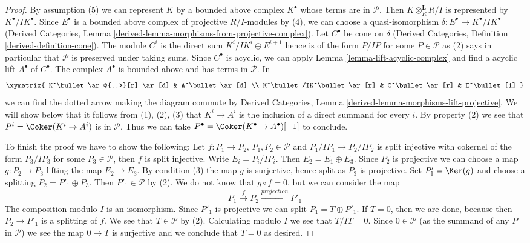 \begin{proof}
By assumption (5) we can represent $K$ by a bounded above complex 
$K^\bullet$ whose terms are in $\mathcal{P}$. Then $K \otimes_R^\mathbf{L} R/I$
is represented by $K^\bullet/IK^\bullet$. Since $E^\bullet$ is
a bounded above complex of projective $R/I$-modules by (4), 
we can choose a quasi-isomorphism $\delta : E^\bullet \to K^\bullet/IK^\bullet$
(Derived Categories, Lemma
\ref{derived-lemma-morphisms-from-projective-complex}).
Let $C^\bullet$ be cone on $\delta$
(Derived Categories, Definition \ref{derived-definition-cone}).
The module $C^i$ is the direct sum $K^i/IK^i \oplus E^{i + 1}$
hence is of the form $P/IP$ for some $P \in \mathcal{P}$
as (2) says in particular that $\mathcal{P}$ is preserved under taking sums.
Since $C^\bullet$ is acyclic, we can apply
Lemma \ref{lemma-lift-acyclic-complex} and find a acyclic
lift $A^\bullet$ of $C^\bullet$. The complex $A^\bullet$ is
bounded above and has terms in $\mathcal{P}$. In
$$
\xymatrix{
K^\bullet \ar@{..>}[r] \ar[d] & A^\bullet \ar[d] \\
K^\bullet/IK^\bullet \ar[r] & C^\bullet \ar[r] & E^\bullet[1]
}
$$
we can find the dotted arrow making the diagram commute
by Derived Categories, Lemma
\ref{derived-lemma-morphisms-lift-projective}.
We will show below that it follows from (1), (2), (3)
that $K^i \to A^i$ is the inclusion of a direct summand
for every $i$. By property (2) we see that $P^i = \Coker(K^i \to A^i)$
is in $\mathcal{P}$. Thus we can take
$P^\bullet = \Coker(K^\bullet \to A^\bullet)[-1]$ to conclude.

\medskip\noindent
To finish the proof we have to show the following: Let $f : P_1 \to P_2$,
$P_1, P_2 \in \mathcal{P}$ and $P_1/IP_1 \to P_2/IP_2$ is split
injective with cokernel of the form $P_3/IP_3$ for some
$P_3 \in \mathcal{P}$, then $f$ is split injective.
Write $E_i = P_i/IP_i$. Then $E_2 = E_1 \oplus E_3$.
Since $P_2$ is projective we can choose a map $g : P_2 \to P_3$
lifting the map $E_2 \to E_3$. By condition (3) the map $g$
is surjective, hence split as $P_3$ is projective. Set $P_1' = \Ker(g)$
and choose a splitting $P_2 = P'_1 \oplus P_3$. Then $P'_1 \in \mathcal{P}$
by (2). We do not know that
$g \circ f = 0$, but we can consider the map
$$
P_1 \xrightarrow{f} P_2 \xrightarrow{projection} P'_1
$$
The composition modulo $I$ is an isomorphism. Since $P'_1$ is
projective we can split $P_1 = T \oplus P'_1$. If $T = 0$, then
we are done, because then $P_2 \to P'_1$ is a splitting of $f$.
We see that $T \in \mathcal{P}$ by (2).
Calculating modulo $I$ we see that $T/IT = 0$.
Since $0 \in \mathcal{P}$ (as the summand of any $P$ in $\mathcal{P}$)
we see the map $0 \to T$ is surjective and we conclude that $T = 0$
as desired.
\end{proof}

